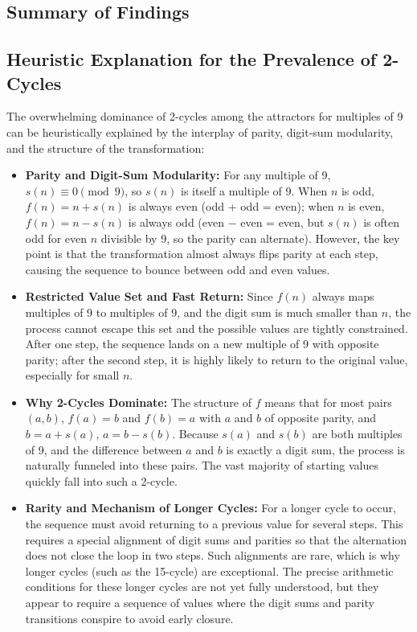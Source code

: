 \documentclass[12pt]{article}
\begin{document}
\subsection{Summary of Findings}
\subsection{Heuristic Explanation for the Prevalence of 2-Cycles}
The overwhelming dominance of 2-cycles among the attractors for multiples of 9 can be heuristically explained by the interplay of parity, digit-sum modularity, and the structure of the transformation:

\begin{itemize}
    \item \textbf{Parity and Digit-Sum Modularity:} For any multiple of 9, $s(n) \equiv 0 \pmod{9}$, so $s(n)$ is itself a multiple of 9. When $n$ is odd, $f(n) = n + s(n)$ is always even (odd + odd = even); when $n$ is even, $f(n) = n - s(n)$ is always odd (even $-$ even = even, but $s(n)$ is often odd for even $n$ divisible by 9, so the parity can alternate). However, the key point is that the transformation almost always flips parity at each step, causing the sequence to bounce between odd and even values.
    \item \textbf{Restricted Value Set and Fast Return:} Since $f(n)$ always maps multiples of 9 to multiples of 9, and the digit sum is much smaller than $n$, the process cannot escape this set and the possible values are tightly constrained. After one step, the sequence lands on a new multiple of 9 with opposite parity; after the second step, it is highly likely to return to the original value, especially for small $n$.
    \item \textbf{Why 2-Cycles Dominate:} The structure of $f$ means that for most pairs $(a, b)$, $f(a) = b$ and $f(b) = a$ with $a$ and $b$ of opposite parity, and $b = a + s(a)$, $a = b - s(b)$. Because $s(a)$ and $s(b)$ are both multiples of 9, and the difference between $a$ and $b$ is exactly a digit sum, the process is naturally funneled into these pairs. The vast majority of starting values quickly fall into such a 2-cycle.
    \item \textbf{Rarity and Mechanism of Longer Cycles:} For a longer cycle to occur, the sequence must avoid returning to a previous value for several steps. This requires a special alignment of digit sums and parities so that the alternation does not close the loop in two steps. Such alignments are rare, which is why longer cycles (such as the 15-cycle) are exceptional. The precise arithmetic conditions for these longer cycles are not yet fully understood, but they appear to require a sequence of values where the digit sums and parity transitions conspire to avoid early closure.
\end{itemize}
\end{document}
